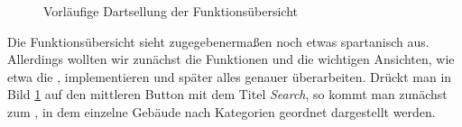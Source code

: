 \documentclass{report}
\begin{document}
\begin{figure}[ht]\label{bild_5}
\centering {}
\caption{Vorläufige Dartsellung der Funktionsübersicht}
\end{figure}

Die Funktionsübersicht sieht zugegebenermaßen noch etwas spartanisch aus. Allerdings wollten wir zunächst die Funktionen und die wichtigen Ansichten, wie etwa die , implementieren und später alles genauer überarbeiten. Drückt man in Bild \ref{bild_5} auf den mittleren Button mit dem Titel \emph{Search}, so kommt man zunächst zum , in dem einzelne Gebäude nach Kategorien geordnet dargestellt werden.
\end{document}
